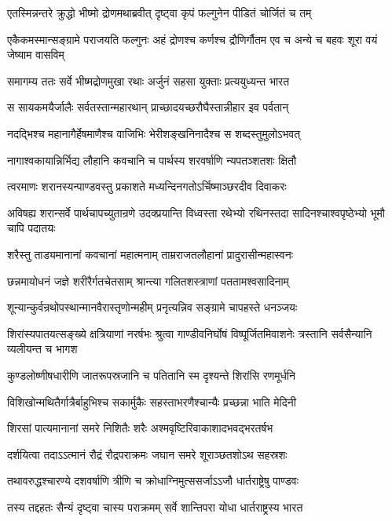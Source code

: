 \twolineshloka
{एतस्मिन्नन्तरे क्रुद्धो भीष्मो द्रोणमथाब्रवीत्}
{दृष्ट्वा कृपं फल्गुनेन पीडितं चोर्जितं च तम्}


\threelineshloka
{एकैकमस्मान्सङ्ग्रामे पराजयति फल्गुनः}
{अहं द्रोणश्च कर्णश्च द्रौणिर्गौतम एव च}
{अन्ये च बहवः शूरा वयं जेष्याम वासविम्}


\twolineshloka
{समागम्य ततः सर्वे भीष्मद्रोणमुखा रथाः}
{अर्जुनं सहसा युक्ताः प्रत्ययुध्यन्त भारत}


\twolineshloka
{स सायकमयैर्जालैः सर्वतस्तान्महारथान्}
{प्राच्छादयच्छरौघैस्तान्नीहार इव पर्वतान्}


\twolineshloka
{नदद्भिश्च महानागैर्हेषमाणैश्च वाजिभिः}
{भेरीशङ्खनिनादैश्च स शब्दस्तुमुलोऽभवत्}


\twolineshloka
{नागाश्वकायान्निर्भिद्य लौहानि कवचानि च}
{पार्थस्य शरवर्षाणि न्यपतञ्शतशः क्षितौ}


\twolineshloka
{त्वरमाणः शरानस्यन्पाण्डवस्तु प्रकाशते}
{मध्यन्दिनगतोऽर्चिष्माञ्छरदीव दिवाकरः}


\threelineshloka
{अविषह्य शरान्सर्वे पार्थचापच्युतान्रणे}
{उदक्प्रयान्ति विध्वस्ता रथेभ्यो रथिनस्तदा}
{सादिनश्चाश्वपृष्ठेभ्यो भूमौ चापि पदातयः}


\twolineshloka
{शरैस्तु ताड्यमानानां कवचानां महात्मनाम्}
{ताम्रराजतलौहानां प्रादुरासीन्महास्वनः}


\twolineshloka
{छन्नमायोधनं जज्ञे शरीरैर्गतचेतसाम्}
{श्रान्त्या गलितशस्त्राणां पततामश्वसादिनाम्}


\twolineshloka
{शून्यान्कुर्वन्रथोपस्थान्मानवैरास्तृणोन्महीम्}
{प्रनृत्यन्निव सङ्ग्रामे चापहस्ते धनञ्जयः}


\threelineshloka
{शिरांस्यपातयत्सङ्ख्ये क्षत्रियाणां नरर्षभः}
{श्रुत्वा गाण्डीवनिर्घोषं विष्पूर्जितमिवाशनेः}
{त्रस्तानि सर्वसैन्यानि व्यलीयन्त च भागश}


\twolineshloka
{कुण्डलोष्णीषधारीणि जातरूपस्रजानि च}
{पतितानि स्म दृश्यन्ते शिरांसि रणमूर्धनि}


\twolineshloka
{विशिखोन्मथितैर्गात्रैर्बाहुभिश्च सकार्मुकैः}
{सहस्ताभरणैश्चान्यैः प्रच्छन्ना भाति मेदिनी}


\twolineshloka
{शिरसां पात्यमानानां समरे निशितैः शरैः}
{अश्मवृष्टिरिवाकाशादभवद्भरतर्षभ}


\twolineshloka
{दर्शयित्वा तदाऽऽत्मानं रौद्रं रौद्रपराक्रमः}
{जघान समरे शूराञ्छतशोऽथ सहस्रशः}


\twolineshloka
{तथावरुद्धश्चारण्ये दशवर्षाणि त्रीणि च}
{क्रोधाग्निमुत्ससर्जाऽऽजौ धार्तराष्ट्रेषु पाण्डवः}


\twolineshloka
{तस्य तद्दहतः सैन्यं दृष्ट्वा चास्य पराक्रमम्}
{सर्वे शान्तिपरा योधा धार्तराष्ट्रस्य भारत}


